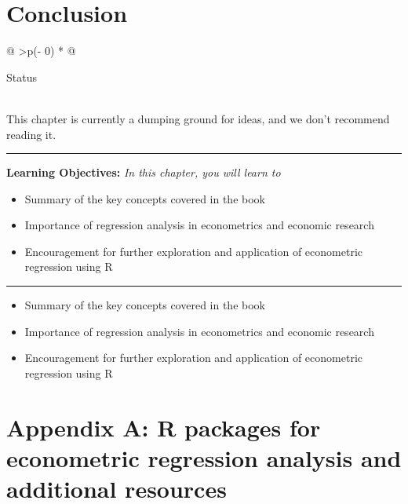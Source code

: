 \documentclass[
  letterpaper,
  paper =a4,
  twoside,
  openright,
  headsepline,
  footsepline,
  listof = totocnumbered,
  chapterprefix = true,
  firstiscover]{scrbook}
\providecommand{\abstractname}{Learning Objectives} %
\newenvironment{objectives}[1]{%
	\hrule
	\vspace{5pt}
	\small\textbf{\abstractname: } 
	\newline
	\vspace{0.1cm}
	\small\emph{#1} %
	\itshape %
}{%
	\vspace{5pt}
	\hrule
	\vspace{0.6cm}
}
\begin{document}

\hypertarget{conclusion}{%
\chapter{Conclusion}\label{conclusion}}

\begin{longtable}[]{@{}
  >{\centering\arraybackslash}p{(\columnwidth - 0\tabcolsep) * }@{}}
\toprule\noalign{}
\begin{minipage}[b]{\linewidth}\centering
Status
\end{minipage} \\
\midrule\noalign{}
\endhead
\bottomrule\noalign{}
\endlastfoot
This chapter is currently a dumping ground for ideas, and we don't
recommend reading it. \\
\end{longtable}

\begin{objectives}{In this chapter, you will learn to}
\begin{itemize}

\item{Summary of the key concepts covered in the book}

\item{Importance of regression analysis in econometrics and economic research}

\item{Encouragement for further exploration and application of econometric regression using R}

\end{itemize}

\end{objectives}

\begin{itemize}
\item
  Summary of the key concepts covered in the book
\item
  Importance of regression analysis in econometrics and economic
  research
\item
  Encouragement for further exploration and application of econometric
  regression using R
\end{itemize}

\cleardoublepage
{}
{}
\appendix

\hypertarget{appendix-a-r-packages-for-econometric-regression-analysis-and-additional-resources}{%
\chapter{Appendix A: R packages for econometric regression analysis and
additional
resources}\label{appendix-a-r-packages-for-econometric-regression-analysis-and-additional-resources}}
\end{document}
